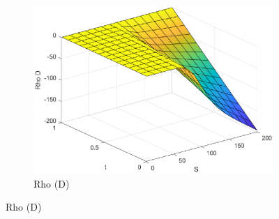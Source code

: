 \begin{figure}[H]
\begin{subfigure}[b]{0.35\linewidth}
        \includegraphics[width=\linewidth]{Imagenes/Parte1/6_Sols/Call/Call_Rho_D.eps}
        \caption{Rho (D)}
    \end{subfigure}
\end{figure}


